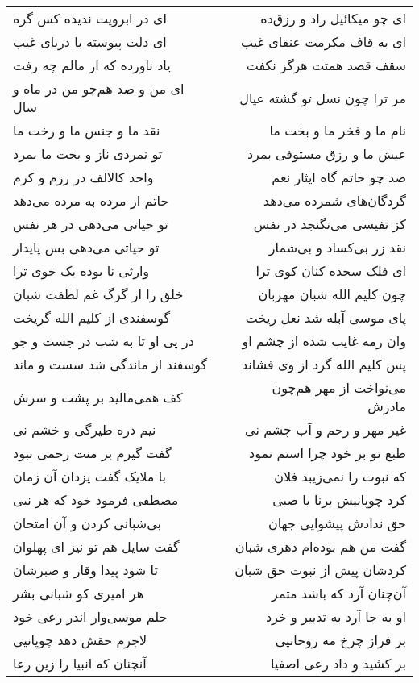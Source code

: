 \begin{center}
\begin{longtable}{l p{0.5cm} r}
ای در ابرویت ندیده کس گره
&&
ای چو میکائیل راد و رزق‌ده
\\
ای دلت پیوسته با دریای غیب
&&
ای به قاف مکرمت عنقای غیب
\\
یاد ناورده که از مالم چه رفت
&&
سقف قصد همتت هرگز نکفت
\\
ای من و صد هم‌چو من در ماه و سال
&&
مر ترا چون نسل تو گشته عیال
\\
نقد ما و جنس ما و رخت ما
&&
نام ما و فخر ما و بخت ما
\\
تو نمردی ناز و بخت ما بمرد
&&
عیش ما و رزق مستوفی بمرد
\\
واحد کالالف در رزم و کرم
&&
صد چو حاتم گاه ایثار نعم
\\
حاتم ار مرده به مرده می‌دهد
&&
گردگان‌های شمرده می‌دهد
\\
تو حیاتی می‌دهی در هر نفس
&&
کز نفیسی می‌نگنجد در نفس
\\
تو حیاتی می‌دهی بس پایدار
&&
نقد زر بی‌کساد و بی‌شمار
\\
وارثی نا بوده یک خوی ترا
&&
ای فلک سجده کنان کوی ترا
\\
خلق را از گرگ غم لطفت شبان
&&
چون کلیم الله شبان مهربان
\\
گوسفندی از کلیم الله گریخت
&&
پای موسی آبله شد نعل ریخت
\\
در پی او تا به شب در جست و جو
&&
وان رمه غایب شده از چشم او
\\
گوسفند از ماندگی شد سست و ماند
&&
پس کلیم الله گرد از وی فشاند
\\
کف همی‌مالید بر پشت و سرش
&&
می‌نواخت از مهر هم‌چون مادرش
\\
نیم ذره طیرگی و خشم نی
&&
غیر مهر و رحم و آب چشم نی
\\
گفت گیرم بر منت رحمی نبود
&&
طبع تو بر خود چرا استم نمود
\\
با ملایک گفت یزدان آن زمان
&&
که نبوت را نمی‌زیبد فلان
\\
مصطفی فرمود خود که هر نبی
&&
کرد چوپانیش برنا یا صبی
\\
بی‌شبانی کردن و آن امتحان
&&
حق ندادش پیشوایی جهان
\\
گفت سایل هم تو نیز ای پهلوان
&&
گفت من هم بوده‌ام دهری شبان
\\
تا شود پیدا وقار و صبرشان
&&
کردشان پیش از نبوت حق شبان
\\
هر امیری کو شبانی بشر
&&
آن‌چنان آرد که باشد متمر
\\
حلم موسی‌وار اندر رعی خود
&&
او به جا آرد به تدبیر و خرد
\\
لاجرم حقش دهد چوپانیی
&&
بر فراز چرخ مه روحانیی
\\
آنچنان که انبیا را زین رعا
&&
بر کشید و داد رعی اصفیا

\end{longtable}
\end{center}
